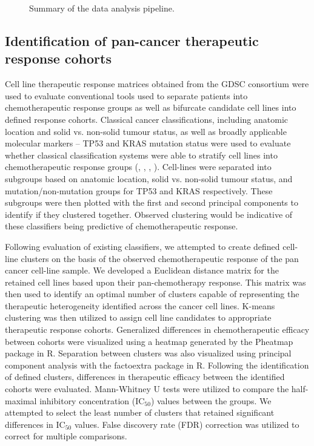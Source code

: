 \documentclass[10pt, letterpaper]{article}
\begin{document}
\begin{multicols}{2}
\begin{figure}[!ht]
    \caption{Summary of the data analysis pipeline.}
    \label{fig:pipeline}
\end{figure}


\subsection*{Identification of pan-cancer therapeutic response cohorts}
Cell line therapeutic response matrices obtained from the GDSC consortium were used to evaluate conventional tools used to separate patients into chemotherapeutic response groups as well as bifurcate candidate cell lines into defined response cohorts. Classical cancer classifications, including anatomic location and solid vs. non-solid tumour status, as well as broadly applicable molecular markers -- TP53 and KRAS mutation status were used to evaluate whether classical classification systems were able to stratify cell lines into chemotherapeutic response groups (\cite{colorectal}, \cite{gi}, \cite{lung}, \cite{breast}). Cell-lines were separated into subgroups based on anatomic location, solid vs. non-solid tumour status, and mutation/non-mutation groups for TP53 and KRAS respectively. These subgroups were then plotted with the first and second principal components to identify if they clustered together. Observed clustering would be indicative of these classifiers being predictive of chemotherapeutic response. 

Following evaluation of existing classifiers, we attempted to create defined cell-line clusters on the basis of the observed chemotherapeutic response of the pan cancer cell-line sample. We developed a Euclidean distance matrix for the retained cell lines based upon their pan-chemotherapy response. This matrix was then used to identify an optimal number of clusters capable of representing the therapeutic heterogeneity identified across the cancer cell lines. K-means clustering was then utilized to assign cell line candidates to appropriate therapeutic response cohorts. Generalized differences in chemotherapeutic efficacy between cohorts were visualized using a heatmap generated by the Pheatmap package in R. Separation between clusters was also visualized using principal component analysis with the factoextra package in R. Following the identification of defined clusters, differences in therapeutic efficacy between the identified cohorts were evaluated. Mann-Whitney U tests were utilized to compare the half-maximal inhibitory concentration (IC$_{50}$) values between the groups. We attempted to select the least number of clusters that retained significant differences in IC$_{50}$ values. False discovery rate (FDR) correction was utilized to correct for multiple comparisons.



\end{multicols}
\end{document}
